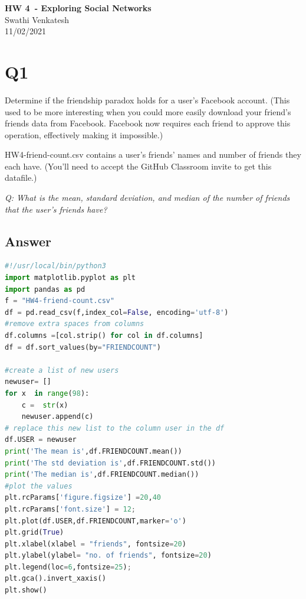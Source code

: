 \documentclass[12pt]{article}
\begin{document}
\begin{centering}
{\large\textbf{HW 4\ - Exploring Social Networks}}\\ 
Swathi Venkatesh\\
11/02/2021\\
\end{centering}


\section*{Q1}
Determine if the friendship paradox holds for a user's Facebook account. (This used to be more interesting when you could more easily download your friend's friends data from Facebook. Facebook now requires each friend to approve this operation, effectively making it impossible.)

HW4-friend-count.csv contains a user's friends' names and number of friends they each have. (You'll need to accept the GitHub Classroom invite to get this datafile.)

\emph{Q: What is the mean, standard deviation, and median of the number of friends that the user's friends have?}

\subsection*{Answer}

\begin{lstlisting}[language=Python, caption=frienshipParadox.py , label=lst:copy]
#!/usr/local/bin/python3
import matplotlib.pyplot as plt
import pandas as pd
f = "HW4-friend-count.csv"
df = pd.read_csv(f,index_col=False, encoding='utf-8')
#remove extra spaces from columns
df.columns =[col.strip() for col in df.columns]
df = df.sort_values(by="FRIENDCOUNT")

#create a list of new users
newuser= []
for x  in range(98):
    c =  str(x)
    newuser.append(c)
# replace this new list to the column user in the df
df.USER = newuser
print('The mean is',df.FRIENDCOUNT.mean())
print('The std deviation is',df.FRIENDCOUNT.std())
print('The median is',df.FRIENDCOUNT.median())
#plot the values
plt.rcParams['figure.figsize'] =20,40
plt.rcParams['font.size'] = 12;
plt.plot(df.USER,df.FRIENDCOUNT,marker='o')
plt.grid(True)
plt.xlabel(xlabel = "friends", fontsize=20)
plt.ylabel(ylabel= "no. of friends", fontsize=20)
plt.legend(loc=6,fontsize=25);
plt.gca().invert_xaxis()
plt.show()


\end{lstlisting}
\end{document}
